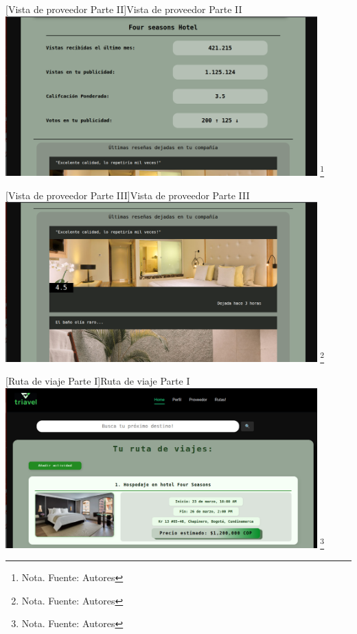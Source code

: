 \begin{itemize}
     \vspace{2mm}
    \begin{minipage}{0.9\textwidth}
    \centering
    [{Vista de proveedor Parte II}]{Vista de proveedor Parte II}
    \label{prot6}
    \includegraphics[width=0.9\textwidth]{Content/Images/VistaProveedor2.png}
    \footnote{Nota. \textup{Fuente: Autores}}
    \end{minipage}

     \vspace{2mm}
    \begin{minipage}{0.9\textwidth}
    \centering
    [{Vista de proveedor Parte III}]{Vista de proveedor Parte III}
    \label{prot7}
    \includegraphics[width=0.9\textwidth]{Content/Images/VistaProveedor3.png}
    \footnote{Nota. \textup{Fuente: Autores}}
    \end{minipage}

     \vspace{2mm}
    \begin{minipage}{0.9\textwidth}
    \centering
    [{Ruta de viaje Parte I}]{Ruta de viaje Parte I}
    \label{prot8}
    \includegraphics[width=0.9\textwidth]{Content/Images/RutaDeViaje1.png}
    \footnote{Nota. \textup{Fuente: Autores}}
    \end{minipage}


\end{itemize}
